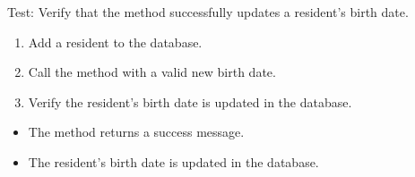 \documentclass[letterpaper,10pt,english]{sphinxmanual}
\begin{document}
\begin{fulllineitems}
\label{\detokenize{test:test.test_residetnt.test_update_resident_birthdate_success}}
\pysigstartsignatures
\pysiglinewithargsret
{}
{}
{}
\pysigstopsignatures
\sphinxAtStartPar
Test: Verify that the method successfully updates a resident’s birth date.
\begin{description}
\begin{enumerate}
%
\item {} 
\sphinxAtStartPar
Add a resident to the database.

\item {} 
\sphinxAtStartPar
Call the  method with a valid new birth date.

\item {} 
\sphinxAtStartPar
Verify the resident’s birth date is updated in the database.

\end{enumerate}

\begin{itemize}
\item {} 
\sphinxAtStartPar
The method returns a success message.

\item {} 
\sphinxAtStartPar
The resident’s birth date is updated in the database.

\end{itemize}

\end{description}

\end{fulllineitems}

\end{document}
